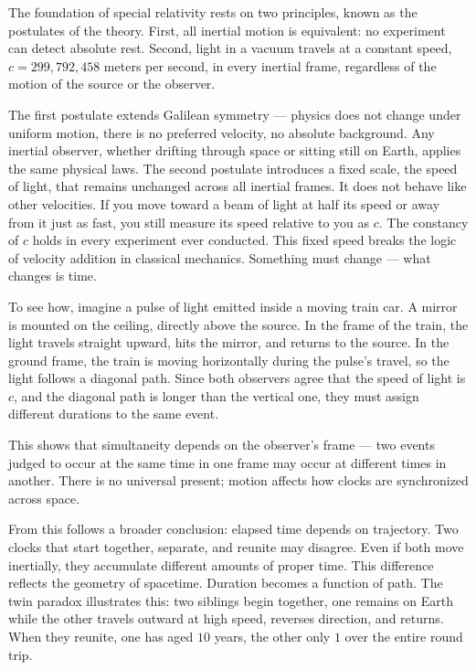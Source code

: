 The foundation of special relativity rests on two principles, known as the postulates of the theory. First, all inertial motion is equivalent: no experiment can detect absolute rest. Second, light in a vacuum travels at a constant speed, $c = 299{,}792{,}458$ meters per second, in every inertial frame, regardless of the motion of the source or the observer. 

The first postulate extends Galilean symmetry — physics does not change under uniform motion, there is no preferred velocity, no absolute background. Any inertial observer, whether drifting through space or sitting still on Earth, applies the same physical laws. The second postulate introduces a fixed scale, the speed of light, that remains unchanged across all inertial frames. It does not behave like other velocities. If you move toward a beam of light at half its speed or away from it just as fast, you still measure its speed relative to you as $c$. The constancy of $c$ holds in every experiment ever conducted. This fixed speed breaks the logic of velocity addition in classical mechanics. Something must change — what changes is time.

To see how, imagine a pulse of light emitted inside a moving train car. A mirror is mounted on the ceiling, directly above the source. In the frame of the train, the light travels straight upward, hits the mirror, and returns to the source. In the ground frame, the train is moving horizontally during the pulse's travel, so the light follows a diagonal path. Since both observers agree that the speed of light is $c$, and the diagonal path is longer than the vertical one, they must assign different durations to the same event.

This shows that simultaneity depends on the observer's frame — two events judged to occur at the same time in one frame may occur at different times in another. There is no universal present; motion affects how clocks are synchronized across space.

From this follows a broader conclusion: elapsed time depends on trajectory. Two clocks that start together, separate, and reunite may disagree. Even if both move inertially, they accumulate different amounts of proper time. This difference reflects the geometry of spacetime. Duration becomes a function of path. The twin paradox illustrates this: two siblings begin together, one remains on Earth while the other travels outward at high speed, reverses direction, and returns. When they reunite, one has aged $10$ years, the other only $1$ over the entire round trip.

